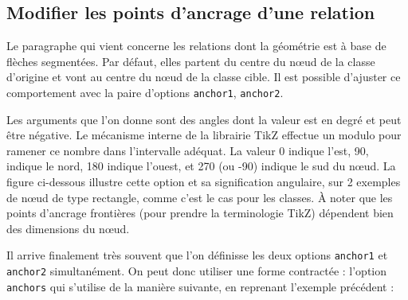 \documentclass[a4paper,11pt]{report}
\newcommand{\inputTikZ}[1]{%
  }%
\newcommand{\inputTikZ}[1]{%
    \texttt{[image: fig/\#1.pdf]}%
  }%
\begin{document}
\medskip

\begin{minipage}{0.5\textwidth}

\end{minipage}
\begin{minipage}{0.4\textwidth}
\begin{center}
\inputTikZ{figure19}
\end{center}
\end{minipage}

\subsection{Modifier les points d'ancrage d'une relation}

Le paragraphe qui vient concerne les relations dont la géométrie est à base de flèches segmentées. Par défaut, elles partent du centre du n\oe{}ud de la classe d'origine et vont au centre du n\oe{}ud de la classe cible. Il est possible d'ajuster ce comportement avec la paire d'options {\tt anchor1}, {\tt anchor2}.

\medskip

\begin{minipage}{0.6\textwidth}

\end{minipage}
\begin{minipage}{0.4\textwidth}
\begin{center}
\inputTikZ{figure20}
\end{center}
\end{minipage}

\medskip

Les arguments que l'on donne sont des angles dont la valeur est en degré et peut être négative. Le mécanisme interne de la librairie {\sc TikZ} effectue un modulo pour ramener ce nombre dans l'intervalle adéquat. La valeur 0 indique l'est, 90, indique le nord, 180 indique l'ouest, et 270 (ou -90) indique le sud du n\oe{}ud. La figure ci-dessous illustre cette option et sa signification angulaire, sur 2 exemples de n\oe{}ud de type rectangle, comme c'est le cas pour les classes. \`{A} noter que les points d'ancrage frontières (pour prendre la terminologie TikZ) dépendent bien des dimensions du n\oe{}ud.

\begin{center}
\inputTikZ{figure21}
\end{center}

Il arrive finalement très souvent que l'on définisse les deux options {\tt anchor1} et {\tt anchor2} simultanément. On peut donc utiliser une forme contractée : l'option {\tt anchors} qui s'utilise de la manière suivante, en reprenant l'exemple précédent :
\end{document}
